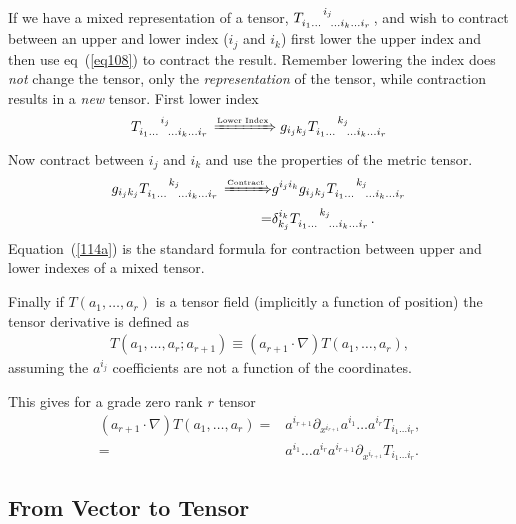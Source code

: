 \documentclass[12pt]{report}
\newcommand{\lp}{\left (}
\newcommand{\rp}{\right )}
\newcommand{\f}[2]{{#1}\lp {#2} \rp}
\newcommand{\be}{\begin{equation}}
\newcommand{\ee}{\end{equation}}
\begin{document}
If we have a mixed representation of a tensor, $T\indices{_{i_{1}\dots}^{i_{j}}_{\dots i_{k}\dots i_{r}}}$,
and wish to contract between an upper and lower index ($i_{j}$ and $i_{k}$) first lower the upper index and then use eq~(\ref{eq108})
to contract the result.  Remember lowering the index does \emph{not} change the tensor, only the \emph{representation} of the tensor,
while contraction results in a \emph{new} tensor.  First lower index
\be
    T\indices{_{i_{1}\dots}^{i_{j}}_{\dots i_{k}\dots i_{r}}} \xRightarrow{\mbox{\tiny Lower Index}} g_{i_{j}k_{j}}T\indices{_{i_{1}\dots}^{k_{j}}_{\dots i_{k}\dots i_{r}}}
\ee
Now contract between $i_{j}$ and $i_{k}$ and use the properties of the metric tensor.
\begin{align}
    g_{i_{j}k_{j}}T\indices{_{i_{1}\dots}^{k_{j}}_{\dots i_{k}\dots i_{r}}} \xRightarrow{\mbox{\tiny Contract}}&
                g^{i_{j}i_{k}}g_{i_{j}k_{j}}T\indices{_{i_{1}\dots}^{k_{j}}_{\dots i_{k}\dots i_{r}}} \nonumber \\
                =& \delta_{k_{j}}^{i_{k}}T\indices{_{i_{1}\dots}^{k_{j}}_{\dots i_{k}\dots i_{r}}}. \label{114a}
\end{align}
Equation~(\ref{114a}) is the standard formula for contraction between upper and lower indexes of a mixed tensor.

Finally if $\f{T}{a_{1},\dots,a_{r}}$ is a tensor field (implicitly a function of position) the tensor derivative is defined as
\begin{align}
    \f{T}{a_{1},\dots,a_{r};a_{r+1}} \equiv \lp a_{r+1}\cdot\nabla\rp\f{T}{a_{1},\dots,a_{r}},
\end{align}
assuming the $a^{i_{j}}$ coefficients are not a function of the coordinates.

This gives for a grade zero rank $r$ tensor
\begin{align}
    \lp a_{r+1}\cdot\nabla\rp\f{T}{a_{1},\dots,a_{r}} =& a^{i_{r+1}}\partial_{x^{i_{r+1}}}a^{i_{1}}\dots a^{i_{r}}
                                                        T_{i_{1}\dots i_{r}}, \nonumber \\
                                                     =& a^{i_{1}}\dots a^{i_{r}}a^{i_{r+1}}
                                                        \partial_{x^{i_{r+1}}}T_{i_{1}\dots i_{r}}.
\end{align}

\subsection{From Vector to Tensor}
\end{document}
